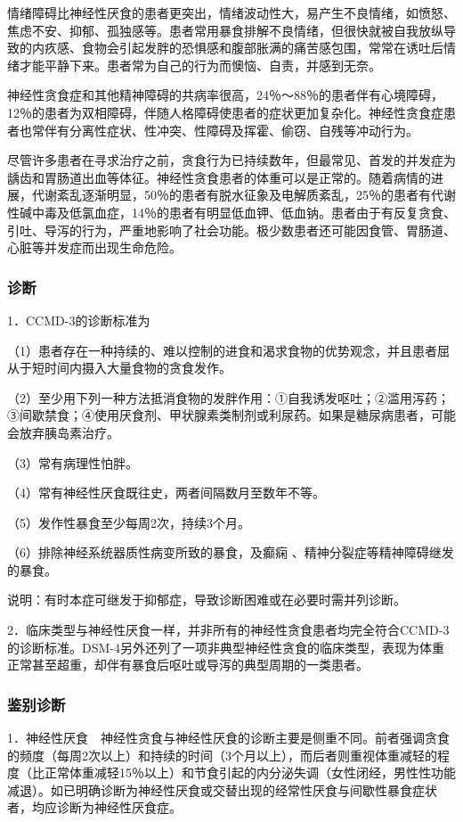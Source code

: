 情绪障碍比神经性厌食的患者更突出，情绪波动性大，易产生不良情绪，如愤怒、焦虑不安、抑郁、孤独感等。患者常用暴食排解不良情绪，但很快就被自我放纵导致的内疚感、食物会引起发胖的恐惧感和腹部胀满的痛苦感包围，常常在诱吐后情绪才能平静下来。患者常为自己的行为而懊恼、自责，并感到无奈。

神经性贪食症和其他精神障碍的共病率很高，24％～88％的患者伴有心境障碍，12％的患者为双相障碍，伴随人格障碍使患者的症状更加复杂化。神经性贪食症患者也常伴有分离性症状、性冲突、性障碍及挥霍、偷窃、自残等冲动行为。

尽管许多患者在寻求治疗之前，贪食行为已持续数年，但最常见、首发的并发症为龋齿和胃肠道出血等体征。神经性贪食患者的体重可以是正常的。随着病情的进展，代谢紊乱逐渐明显，50％的患者有脱水征象及电解质紊乱，25％的患者有代谢性碱中毒及低氯血症，14％的患者有明显低血钾、低血钠。患者由于有反复贪食、引吐、导泻的行为，严重地影响了社会功能。极少数患者还可能因食管、胃肠道、心脏等并发症而出现生命危险。

\subsubsection{诊断}

1．CCMD-3的诊断标准为

（1）患者存在一种持续的、难以控制的进食和渴求食物的优势观念，并且患者屈从于短时间内摄入大量食物的贪食发作。

（2）至少用下列一种方法抵消食物的发胖作用：①自我诱发呕吐；②滥用泻药；③间歇禁食；④使用厌食剂、甲状腺素类制剂或利尿药。如果是糖尿病患者，可能会放弃胰岛素治疗。

（3）常有病理性怕胖。

（4）常有神经性厌食既往史，两者间隔数月至数年不等。

（5）发作性暴食至少每周2次，持续3个月。

（6）排除神经系统器质性病变所致的暴食，及癫痫
、精神分裂症等精神障碍继发的暴食。

说明：有时本症可继发于抑郁症，导致诊断困难或在必要时需并列诊断。

2．临床类型与神经性厌食一样，并非所有的神经性贪食患者均完全符合CCMD-3的诊断标准。DSM-4另外还列了一项非典型神经性贪食的临床类型，表现为体重正常甚至超重，却伴有暴食后呕吐或导泻的典型周期的一类患者。

\subsubsection{鉴别诊断}

1．神经性厌食　神经性贪食与神经性厌食的诊断主要是侧重不同。前者强调贪食的频度（每周2次以上）和持续的时间（3个月以上），而后者则重视体重减轻的程度（比正常体重减轻15％以上）和节食引起的内分泌失调（女性闭经，男性性功能减退）。如已明确诊断为神经性厌食或交替出现的经常性厌食与间歇性暴食症状者，均应诊断为神经性厌食症。


